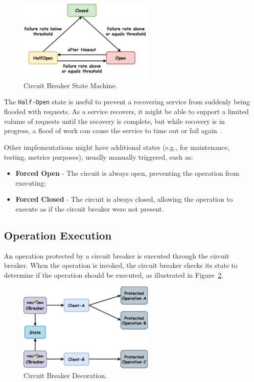 \begin{figure}[!htb]
    \centering
    \includegraphics[width=0.6\textwidth]{../figures/05_cbreaker-states}
    \caption{Circuit Breaker State Machine.}
    \label{fig:circuit-breaker-state-machine}
\end{figure}

The \texttt{Half-Open} state is useful to prevent a recovering service from suddenly being flooded with requests.
As a service recovers, it might be able to support a limited volume of requests until the recovery is complete,
but while recovery is in progress, a flood of work can cause the service
to time out or fail again~\cite{microsoft-cbreaker-pattern}.

Other implementations might have additional states (e.g., for maintenance, testing, metrics purposes), usually manually triggered, such as:

\begin{itemize}
    \item \textbf{Forced Open} - The circuit is always open, preventing the operation from executing;
    \item \textbf{Forced Closed} - The circuit is always closed, allowing the operation to execute as if the circuit breaker were not present.
\end{itemize}

\subsection{Operation Execution}\label{subsec:cbreaker-operation-execution}

An operation protected by a circuit breaker is executed through the circuit breaker.
When the operation is invoked, the circuit breaker checks its state to determine if the operation should be executed,
as illustrated in Figure~\ref{fig:cbreaker-decoration}.

\begin{figure}[!htb]
    \centering
    \includegraphics[width=0.6\textwidth]{../figures/05_cbreaker-decoration}
    \caption{Circuit Breaker Decoration.}
    \label{fig:cbreaker-decoration}
\end{figure}

